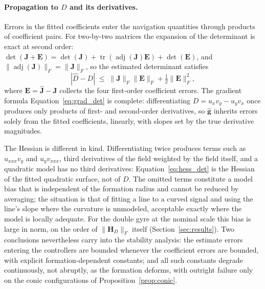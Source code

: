 \documentclass[12pt, letterpaper, oneside]{report}
\begin{document}
\paragraph{Propagation to \texorpdfstring{$D$}{D} and its derivatives.}
Errors in the fitted coefficients enter the navigation quantities through
products of coefficient pairs. For two-by-two matrices the expansion of
the determinant is exact at second order:
$\det(\mathbf{J}+\mathbf{E}) = \det(\mathbf{J}) + \operatorname{tr}(\operatorname{adj}(\mathbf{J})\mathbf{E}) + \det(\mathbf{E})$,
and $\lVert\operatorname{adj}(\mathbf{J})\rVert_F = \lVert\mathbf{J}\rVert_F$,
so the estimated determinant satisfies
\begin{equation}
|\hat D - D| \;\leq\; \lVert\mathbf{J}\rVert_F\lVert\mathbf{E}\rVert_F + \tfrac12\lVert\mathbf{E}\rVert_F^2,
\label{eq:det_perturbation}
\end{equation}
where $\mathbf{E}=\hat{\mathbf{J}}-\mathbf{J}$ collects the four
first-order coefficient errors. The gradient formula
Equation~\eqref{eq:grad_det} is complete: differentiating $D=u_xv_y-u_yv_x$
once produces only products of first- and second-order derivatives, so
$\hat{\mathbf{g}}$ inherits errors solely from the fitted coefficients,
linearly, with slopes set by the true derivative magnitudes.

The Hessian is different in kind. Differentiating twice produces terms
such as $u_{xxx}v_y$ and $u_yv_{xxx}$, third derivatives of the field
weighted by the field itself, and a quadratic model has no third
derivatives: Equation~\eqref{eq:hess_det} is the Hessian of the fitted
quadratic surface, not of $D$. The omitted terms constitute a model bias
that is independent of the formation radius and cannot be reduced by
averaging; the situation is that of fitting a line to a curved signal and
using the line's slope where the curvature is unmodeled, acceptable
exactly where the model is locally adequate. For the double gyre at the
nominal scale this bias is large in norm, on the order of
$\lVert\mathbf{H}_D\rVert_F$ itself (Section~\ref{sec:results}). Two
conclusions nevertheless carry into the stability analysis: the estimate
errors entering the controllers are bounded whenever the coefficient
errors are bounded, with explicit formation-dependent constants; and all
such constants degrade continuously, not abruptly, as the formation
deforms, with outright failure only on the conic configurations of
Proposition~\ref{prop:conic}.
\end{document}
